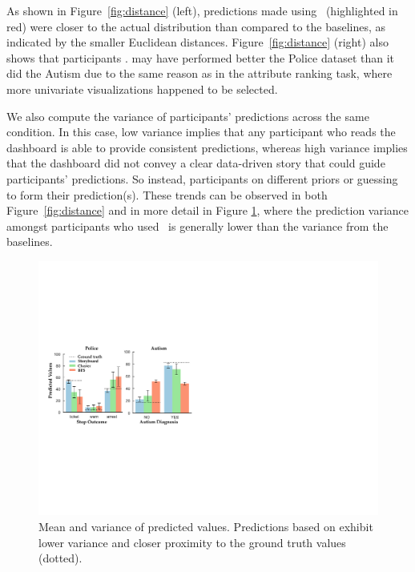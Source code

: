 As shown in Figure~\ref{fig:distance} (left), 
predictions made using \system\ (highlighted in red) 
were closer to the actual distribution than compared to the baselines, 
as indicated by the smaller Euclidean distances. 
Figure~\ref{fig:distance} (right) also shows 
that \system participants . 
\cluster may have performed better  
the Police dataset than it did  
the Autism  
due to the same reason as in the attribute ranking task, where more univariate visualizations happened to be selected. 

\par We also compute the variance of participants' predictions across the same condition. In this case, low variance implies that any participant who reads the dashboard is able to provide consistent predictions, whereas high variance implies that the dashboard did not convey a clear data-driven story that could guide participants' predictions. So instead, participants  on different priors or guessing to form their prediction(s). These trends can be observed in both Figure~\ref{fig:distance} and in more detail in Figure \ref{fig:actual_predictions}, where the prediction variance amongst participants who used \system\ is generally lower than the variance from the baselines. 
\begin{figure}[h!]
\centering
\includegraphics[width=0.85\linewidth]{figures/prediction.pdf}
\caption{Mean and variance of predicted values. Predictions based on \system exhibit lower variance  and closer proximity to the ground truth values (dotted).}
\label{fig:actual_predictions}
\end{figure}
